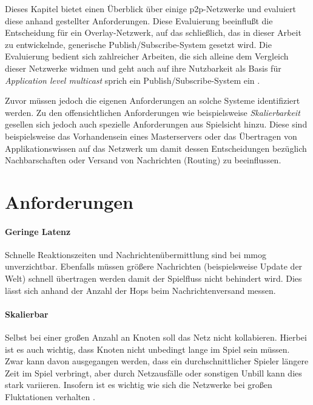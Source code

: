 Dieses Kapitel bietet einen Überblick über einige p2p-Netzwerke und evaluiert diese anhand gestellter Anforderungen. Diese Evaluierung beeinflußt die Entscheidung für ein Overlay-Netzwerk, auf das schließlich, das in dieser Arbeit zu entwickelnde, generische Publish/Subscribe-System gesetzt wird. Die Evaluierung bedient sich zahlreicher Arbeiten, die sich alleine dem Vergleich dieser Netzwerke widmen \cite{Lua2005Survey, Goetz2005, Li2004Comparing, Darlagiannis2006Peertopeer, Castro2002Secure, Bo2003PeertoPeer} und geht auch auf ihre Nutzbarkeit als Basis für \emph{Application level multicast} sprich ein Publish/Subscribe-System ein \cite{Hosseini2007Survey, Fahmy2007, Castro2003Evaluation, Ratnasamy2001}.

Zuvor müssen jedoch die eigenen Anforderungen an solche Systeme identifiziert werden. Zu den offensichtlichen Anforderungen wie beispielsweise \emph{Skalierbarkeit} gesellen sich jedoch auch spezielle Anforderungen aus Spielsicht hinzu. Diese sind beispielsweise das Vorhandensein eines Masterservers oder das Übertragen von Applikationswissen auf das Netzwerk um damit dessen Entscheidungen bezüglich Nachbarschaften oder Versand von Nachrichten (Routing) zu beeinflussen.

\section{Anforderungen}

\paragraph{Geringe Latenz} Schnelle Reaktionszeiten und Nachrichtenübermittlung sind bei \ac{mmog} unverzichtbar. Ebenfalls müssen größere Nachrichten (beispielsweise Update der Welt) schnell übertragen werden damit der Spielfluss nicht behindert wird. Dies lässt sich anhand der Anzahl der Hops beim Nachrichtenversand messen.

\paragraph{Skalierbar} Selbst bei einer großen Anzahl an Knoten soll das Netz nicht kollabieren. Hierbei ist es auch wichtig, dass Knoten nicht unbedingt lange im Spiel sein müssen. Zwar kann davon ausgegangen werden, dass ein durchschnittlicher Spieler längere Zeit im Spiel verbringt, aber durch Netzausfälle oder sonstigen Unbill kann dies stark variieren. Insofern ist es wichtig wie sich die Netzwerke bei großen Fluktationen verhalten \cite{Li2004Comparing}.

